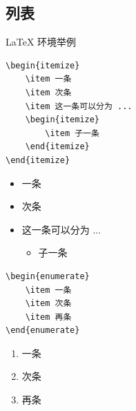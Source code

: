 \subsection{列表}
\begin{frame}[fragile]{\LaTeX{} 环境举例}
    \vspace{1em}
    \begin{minipage}{0.5\linewidth}
        \begin{lstlisting}[basicstyle=\ttfamily\small]
\begin{itemize}
    \item 一条
    \item 次条
    \item 这一条可以分为 ...
    \begin{itemize}
        \item 子一条
    \end{itemize}
\end{itemize}\end{lstlisting}
    \end{minipage}\hspace{1.5cm}
    \begin{minipage}{0.3\linewidth}
        \begin{itemize}
            \item 一条
            \item 次条
            \item 这一条可以分为 ...
                  \begin{itemize}
                      \item 子一条
                  \end{itemize}
        \end{itemize}
    \end{minipage}

    \begin{minipage}{0.5\linewidth}
        \begin{lstlisting}
\begin{enumerate}
    \item 一条
    \item 次条
    \item 再条
\end{enumerate}\end{lstlisting}
    \end{minipage}\hspace{1.5cm}
    \begin{minipage}{0.3\linewidth}
        \vspace{-1cm}
        \begin{enumerate}
            \item 一条
            \item 次条
            \item 再条
        \end{enumerate}
    \end{minipage}
\end{frame}
%

